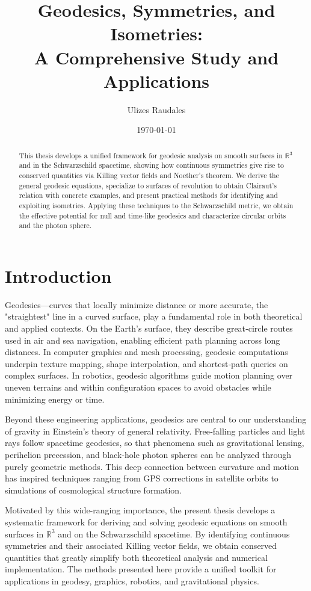 \documentclass[12pt]{article}
\title{Geodesics, Symmetries, and Isometries:\\A Comprehensive Study and Applications}
\author{Ulizes Raudales}
\date{\today}
\newcommand{\R}{\mathbb{R}}
\begin{document}
\maketitle

\newpage
\tableofcontents
\newpage

\begin{abstract}
	This thesis develops a unified framework for geodesic analysis on smooth surfaces in \(\R^3\) and in the Schwarzschild spacetime, showing how continuous symmetries give rise to conserved quantities via Killing vector fields and Noether’s theorem.  
	We derive the general geodesic equations, specialize to surfaces of revolution to obtain Clairaut’s relation with concrete examples, and present practical methods for identifying and exploiting isometries.  
	Applying these techniques to the Schwarzschild metric, we obtain the effective potential for null and time-like geodesics and characterize circular orbits and the photon sphere.
\end{abstract}

\section{Introduction}
Geodesics—curves that locally minimize distance or more accurate, the "straightest" line in a curved surface, play a fundamental role in both theoretical and applied contexts.  
On the Earth’s surface, they describe great‐circle routes used in air and sea navigation, enabling efficient path planning across long distances.  
In computer graphics and mesh processing, geodesic computations underpin texture mapping, shape interpolation, and shortest‐path queries on complex surfaces.  
In robotics, geodesic algorithms guide motion planning over uneven terrains and within configuration spaces to avoid obstacles while minimizing energy or time.

Beyond these engineering applications, geodesics are central to our understanding of gravity in Einstein’s theory of general relativity.  
Free‐falling particles and light rays follow spacetime geodesics, so that phenomena such as gravitational lensing, perihelion precession, and black‐hole photon spheres can be analyzed through purely geometric methods.  
This deep connection between curvature and motion has inspired techniques ranging from GPS corrections in satellite orbits to simulations of cosmological structure formation.

Motivated by this wide-ranging importance, the present thesis develops a systematic framework for deriving and solving geodesic equations on smooth surfaces in \(\R^3\) and on the Schwarzschild spacetime.  
By identifying continuous symmetries and their associated Killing vector fields, we obtain conserved quantities that greatly simplify both theoretical analysis and numerical implementation.  The methods presented here provide a unified toolkit for applications in geodesy, graphics, robotics, and gravitational physics.
\end{document}

